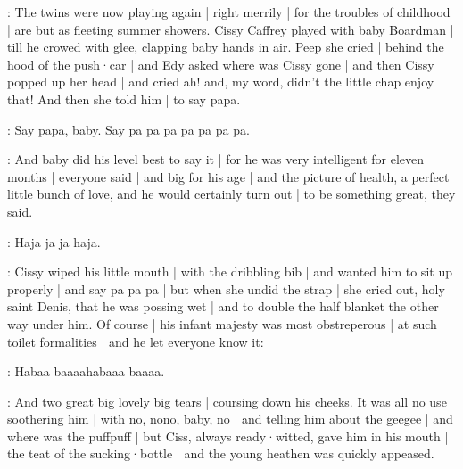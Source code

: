 :
The twins were now playing again |
right merrily |
for the troubles of childhood |
are but as fleeting summer showers.
Cissy Caffrey played with baby Boardman |
till he crowed with glee,
clapping baby hands in air.
Peep she cried |
behind the hood of the push·car |
and Edy asked where was Cissy gone |
and then Cissy popped up her head |
and cried ah!
and,
my word,
didn't the little chap enjoy that!
And then she told him |
to say papa.

\cissy:
Say papa,
baby.
Say pa pa pa pa pa pa pa.

:
And baby did his level best to say it |
for he was very intelligent for eleven months |
everyone said |
and big for his age |
and the picture of health,
a perfect little bunch of love,%
and he would certainly turn out |
to be something great,
they said.

\baby:
Haja ja ja haja.

:
Cissy wiped his little mouth |
with the dribbling bib |
and wanted him to sit up properly |
and say pa pa pa |
but when she undid the strap |
she cried out,
holy saint Denis,
that he was possing wet |
and to double the half blanket the other way under him.
Of course |
his infant majesty was most obstreperous |
at such toilet formalities |
and he let everyone know it:

\baby:
Habaa baaaahabaaa baaaa.

:
And two great big lovely big tears |
coursing down his cheeks.
It was all no use
soothering him |
with no, nono, baby, no |%
and telling him about the geegee |
and where was the puffpuff |
but Ciss,
always ready·witted,
gave him in his mouth |
the teat of the sucking·bottle |
and the young heathen was quickly appeased.

